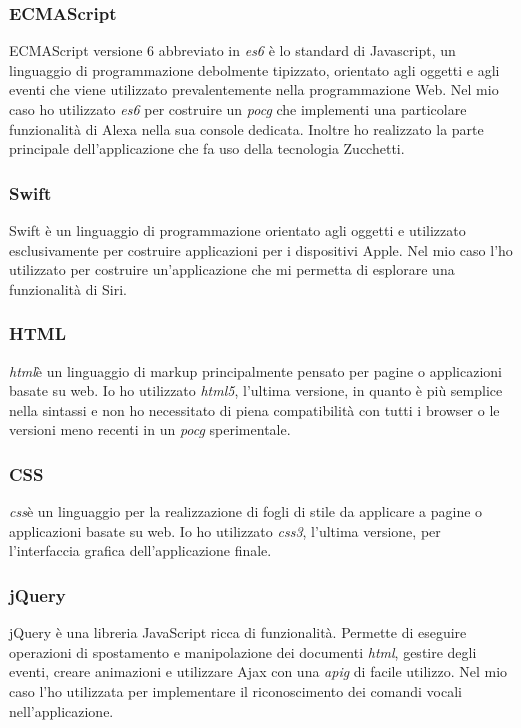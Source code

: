 		\subsubsection{ECMAScript}
		ECMAScript versione 6 abbreviato in \emph{\gls{es6}} è lo standard di Javascript, un linguaggio di programmazione debolmente tipizzato, orientato agli oggetti e agli eventi che viene utilizzato prevalentemente nella programmazione Web. Nel mio caso ho utilizzato \emph{\gls{es6}} per costruire un \emph{\gls{pocg}} che implementi una particolare funzionalità di Alexa nella sua console dedicata. Inoltre ho realizzato la parte principale dell'applicazione che fa uso della tecnologia Zucchetti.
		\subsubsection{Swift}
		Swift è un linguaggio di programmazione orientato agli oggetti e utilizzato esclusivamente per costruire applicazioni per i dispositivi Apple. Nel mio caso l'ho utilizzato per costruire un'applicazione che mi permetta di esplorare una funzionalità di Siri.
		\subsubsection{HTML}
		\emph{\gls{html}}\glsfirstoccur è un linguaggio di markup principalmente pensato per pagine o applicazioni basate su web. Io ho utilizzato \emph{\gls{html}5}, l'ultima versione, in quanto è più semplice nella sintassi e non ho necessitato di piena compatibilità con tutti i browser o le versioni meno recenti in un \emph{\gls{pocg}} sperimentale.
		\subsubsection{CSS}
		\emph{\gls{css}}\glsfirstoccur è un linguaggio per la realizzazione di fogli di stile da applicare a pagine o applicazioni basate su web. Io ho utilizzato \emph{\gls{css}3}, l'ultima versione, per l'interfaccia grafica dell'applicazione finale.
		\subsubsection{jQuery}
		jQuery è una libreria JavaScript ricca di funzionalità. Permette di eseguire operazioni di spostamento e manipolazione dei documenti \emph{\gls{html}}, gestire degli eventi, creare animazioni e utilizzare Ajax con una \emph{\gls{apig}} di facile utilizzo. Nel mio caso l'ho utilizzata per implementare il riconoscimento dei comandi vocali nell'applicazione.
